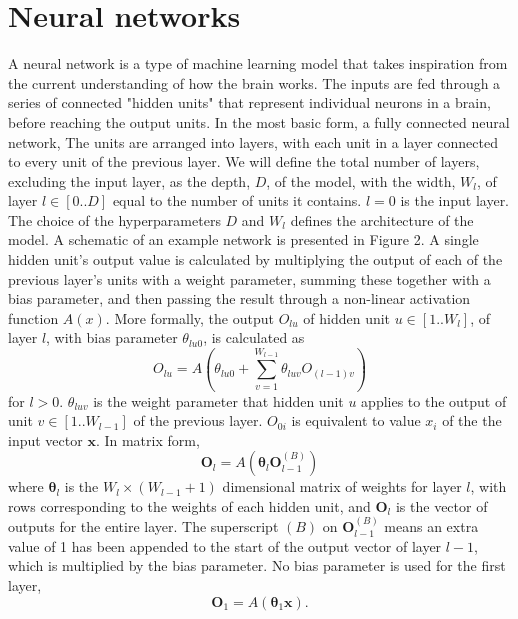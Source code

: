 \documentclass[12pt]{article}
\begin{document}
\section{Neural networks}
A neural network is a type of machine learning model that takes inspiration from the current understanding of how the brain works. The inputs are fed through a series of connected "hidden units" that represent individual neurons in a brain, before reaching the output units. In the most basic form, a fully connected neural network, The units are arranged into layers, with each unit in a layer connected to every unit of the previous layer. We will define the total number of layers, excluding the input layer, as the depth, $D$, of the model, with the width, $W_l$, of layer $l\in[0..D]$ equal to the number of units it contains. $l=0$ is the input layer. The choice of the hyperparameters $D$ and $W_l$ defines the architecture of the model. A schematic of an example network is presented in Figure 2. A single hidden unit's output value is calculated by multiplying the output of each of the previous layer's units with a weight parameter, summing these together with a bias parameter, and then passing the result through a non-linear activation function $A(x)$. More formally, the output $O_{lu}$ of hidden unit $u\in[1..W_l]$, of layer $l$, with bias parameter $\theta_{lu0}$, is calculated as
\begin{equation}
O_{lu}=A\left(\theta_{lu0}+\sum_{v=1}^{W_{l-1}}\theta_{luv}O_{(l-1)v}\right)
\end{equation}
for $l > 0$. $\theta_{luv}$ is the weight parameter that hidden unit $u$ applies to the output of unit $v\in[1..W_{l-1}]$ of the previous layer. $O_{0i}$ is equivalent to value $x_i$ of the the input vector $\mathbf{x}$. In matrix form,
\begin{equation}
\mathbf{O}_l=A\left(\boldsymbol\theta_l\mathbf{O}_{l-1}^{(B)}\right)
\end{equation}
where $\boldsymbol\theta_l$ is the $W_l \times \left(W_{l-1}+1\right)$ dimensional matrix of weights for layer $l$, with rows corresponding to the weights of each hidden unit, and $\mathbf{O}_l$ is the vector of outputs for the entire layer. The superscript $(B)$ on $\mathbf{O}_{l-1}^{(B)}$ means an extra value of 1 has been appended to the start of the output vector of layer $l-1$, which is multiplied by the bias parameter. No bias parameter is used for the first layer,
\begin{equation}
\mathbf{O}_1=A\left(\boldsymbol\theta_1\mathbf{x}\right).
\end{equation}
\end{document}

